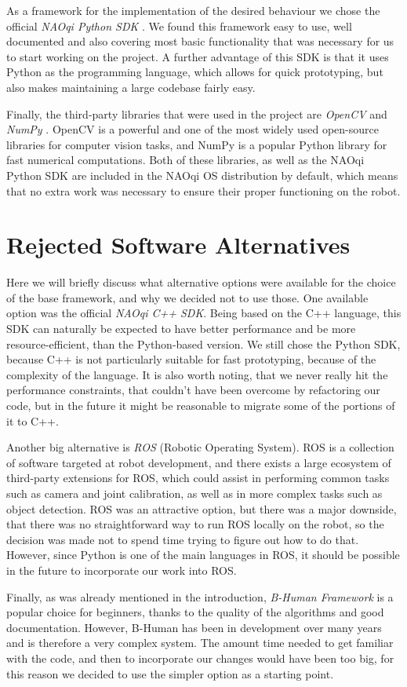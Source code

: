 As a framework for the implementation of the desired behaviour we chose the
official \textit{NAOqi Python SDK} \cite{naoqi-sdk}. We found this framework
easy to use, well documented and also covering most basic functionality that
was necessary for us to start working on the project. A further advantage of
this SDK is that it uses Python as the programming language, which allows for
quick prototyping, but also makes maintaining a large codebase fairly easy.

Finally, the third-party libraries that were used in the project are
\textit{OpenCV} and \textit{NumPy} \cite{opencv, numpy}. OpenCV is a powerful
and one of the most widely used open-source libraries for computer vision
tasks, and NumPy is a popular Python library for fast numerical computations.
Both of these libraries, as well as the NAOqi Python SDK are included in the
NAOqi OS distribution by default, which means that no extra work was necessary
to ensure their proper functioning on the robot.

\section{Rejected Software Alternatives}

Here we will briefly discuss what alternative options were available for the
choice of the base framework, and why we decided not to use those. One
available option was the official \textit{NAOqi C++ SDK}. Being based on the
C++ language, this SDK can naturally be expected to have better performance and
be more resource-efficient, than the Python-based version. We still chose the
Python SDK, because C++ is not particularly suitable for fast prototyping,
because of the complexity of the language. It is also worth noting, that we
never really hit the performance constraints, that couldn't have been overcome
by refactoring our code, but in the future it might be reasonable to migrate
some of the portions of it to C++.

Another big alternative is \textit{ROS} \cite{ros} (Robotic Operating System).
ROS is a collection of software targeted at robot development, and there exists
a large ecosystem of third-party extensions for ROS, which could assist in
performing common tasks such as camera and joint calibration, as well as in
more complex tasks such as object detection. ROS was an attractive option, but
there was a major downside, that there was no straightforward way to run ROS
locally on the robot, so the decision was made not to spend time trying to
figure out how to do that. However, since Python is one of the main languages
in ROS, it should be possible in the future to incorporate our work into ROS.

Finally, as was already mentioned in the introduction, \textit{B-Human
  Framework} is a popular choice for beginners, thanks to the quality of the
algorithms and good documentation. However, B-Human has been in development
over many years and is therefore a very complex system. The amount time needed
to get familiar with the code, and then to incorporate our changes would have
been too big, for this reason we decided to use the simpler option as a
starting point.
